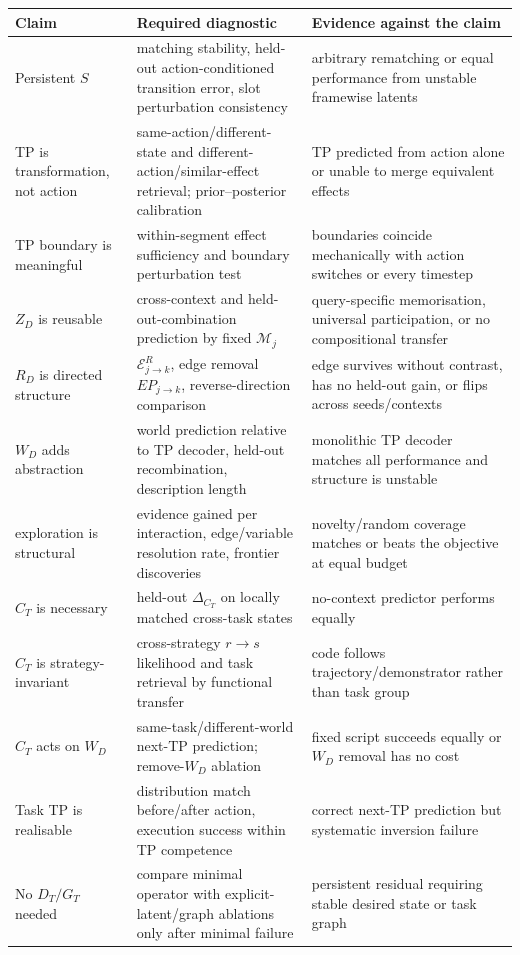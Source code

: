 \documentclass[11pt]{article}
\begin{document}
\begin{center}
\small
\begin{tabularx}{\textwidth}{@{}p{}XX@{}}
\toprule
Claim & Required diagnostic & Evidence against the claim \\
\midrule
Persistent $S$ & matching stability, held-out action-conditioned transition error, slot perturbation consistency & arbitrary rematching or equal performance from unstable framewise latents \\
TP is transformation, not action & same-action/different-state and different-action/similar-effect retrieval; prior--posterior calibration & TP predicted from action alone or unable to merge equivalent effects \\
TP boundary is meaningful & within-segment effect sufficiency and boundary perturbation test & boundaries coincide mechanically with action switches or every timestep \\
$Z_D$ is reusable & cross-context and held-out-combination prediction by fixed $\mathcal M_j$ & query-specific memorisation, universal participation, or no compositional transfer \\
$R_D$ is directed structure & $\mathcal E_{j\rightarrow k}^R$, edge removal $EP_{j\rightarrow k}$, reverse-direction comparison & edge survives without contrast, has no held-out gain, or flips across seeds/contexts \\
$W_D$ adds abstraction & world prediction relative to TP decoder, held-out recombination, description length & monolithic TP decoder matches all performance and structure is unstable \\
exploration is structural & evidence gained per interaction, edge/variable resolution rate, frontier discoveries & novelty/random coverage matches or beats the objective at equal budget \\
$C_T$ is necessary & held-out $\Delta_{C_T}$ on locally matched cross-task states & no-context predictor performs equally \\
$C_T$ is strategy-invariant & cross-strategy $r\rightarrow s$ likelihood and task retrieval by functional transfer & code follows trajectory/demonstrator rather than task group \\
$C_T$ acts on $W_D$ & same-task/different-world next-TP prediction; remove-$W_D$ ablation & fixed script succeeds equally or $W_D$ removal has no cost \\
Task TP is realisable & distribution match before/after action, execution success within TP competence & correct next-TP prediction but systematic inversion failure \\
No $D_T/G_T$ needed & compare minimal operator with explicit-latent/graph ablations only after minimal failure & persistent residual requiring stable desired state or task graph \\
\bottomrule
\end{tabularx}
\end{center}
\end{document}
